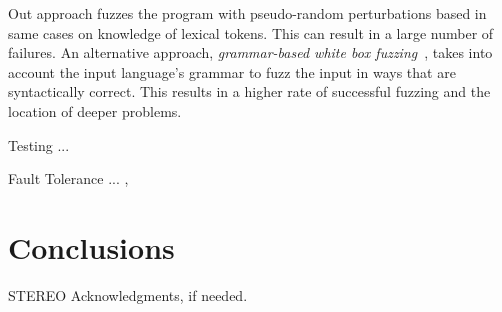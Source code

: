 \documentclass[10pt]{sigplanconf}
\begin{document}
Out approach fuzzes the program with pseudo-random
perturbations based in same cases on knowledge of
lexical tokens.
This can result in a large number of failures.
An alternative approach, {\em grammar-based white box fuzzing}~\cite{Cog08},
takes into account the input language's grammar to fuzz the input in
ways that are syntactically correct.
This results in a higher rate of successful fuzzing and the location
of deeper problems.

Testing ... \cite{HAM06}

Fault Tolerance ... \cite{KOKR07}, \cite{LYU95}

\section{Conclusions} %

\acks

STEREO
Acknowledgments, if needed.








\end{document}
